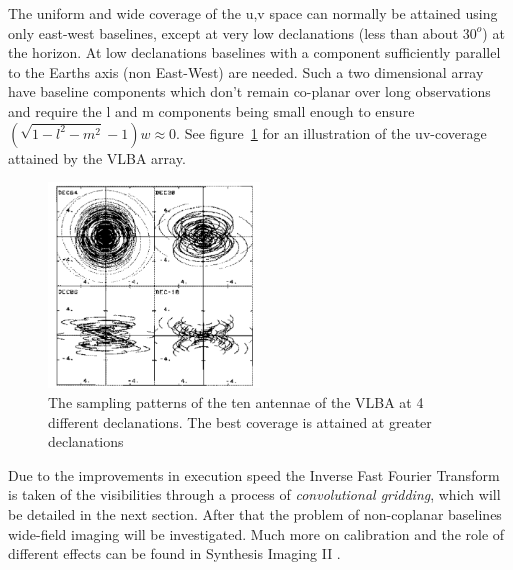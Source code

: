 \documentclass[a4paper,10pt]{report}
\begin{document}
The uniform and wide coverage of the u,v space can normally be attained using only east-west baselines, except at very low declanations (less than about $30^o$) at the horizon. At low declanations baselines with a component sufficiently 
parallel to the Earths axis (non East-West) are needed. Such a two dimensional array have baseline components which don't remain co-planar over long observations and require the l and m components being small enough to ensure $(\sqrt{1 - l^2 - m^2} - 1)w \approx 0$. 
See figure~\ref{fig_VLBA_uv} for an illustration of the uv-coverage attained by the VLBA array.

\begin{figure}[h]
 \begin{mdframed}
 \centering
 \includegraphics[width=0.5\textwidth]{images/eliptical_sampling.png}
 \caption[VLBA uv-coverage]{The sampling patterns of the ten antennae of the VLBA at 4 different declanations. The best coverage is attained at greater declanations}
  \label{fig_VLBA_uv}
 \end{mdframed}
\end{figure}

Due to the improvements in execution speed the Inverse Fast Fourier Transform is taken of the visibilities through a process of \textit{convolutional gridding}, which will be detailed in the next section. After that the problem 
of non-coplanar baselines wide-field imaging will be investigated. Much more on calibration and the role of different effects can be found in Synthesis Imaging II \cite[Lectures 2, 3, 8, 10]{taylor1999synthesis}.
\end{document}

